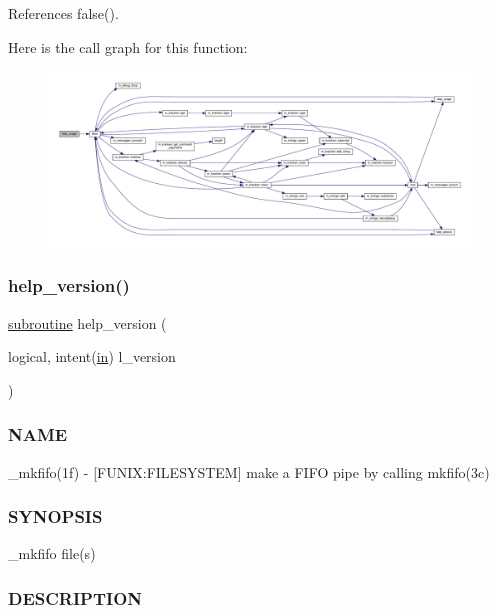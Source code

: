 References false().

Here is the call graph for this function\+:
\nopagebreak
\begin{figure}[H]
\begin{center}
\leavevmode
\includegraphics[width=350pt]{__mkfifo_8f90_a3e09a3b52ee8fb04eeb93fe5761626a8_cgraph}
\end{center}
\end{figure}
\mbox{\label{__mkfifo_8f90_a39c21619b08a3c22f19e2306efd7f766}} 
\subsubsection{\texorpdfstring{help\+\_\+version()}{help\_version()}}
{\footnotesize\ttfamily \hyperlink{M__stopwatch_83_8txt_acfbcff50169d691ff02d4a123ed70482}{subroutine} help\+\_\+version (\begin{DoxyParamCaption}\item[{logical, intent(\hyperlink{M__journal_83_8txt_afce72651d1eed785a2132bee863b2f38}{in})}]{l\+\_\+version }\end{DoxyParamCaption})}



\subsubsection*{N\+A\+ME}

\+\_\+mkfifo(1f) -\/ \mbox{[}F\+U\+N\+IX\+:F\+I\+L\+E\+S\+Y\+S\+T\+EM\mbox{]} make a F\+I\+FO pipe by calling mkfifo(3c) \subsubsection*{S\+Y\+N\+O\+P\+S\+IS}

\+\_\+mkfifo file(s) \subsubsection*{D\+E\+S\+C\+R\+I\+P\+T\+I\+ON}

